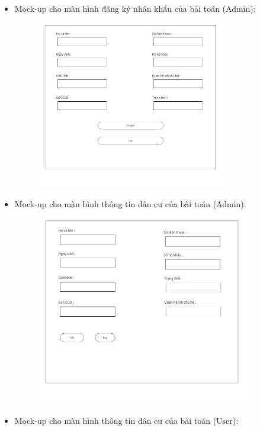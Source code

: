 \documentclass{article}
\begin{document}
\begin{itemize}
\begin{figure}[H]
    \end{figure}
    \item Mock-up cho màn hình đăng ký nhân khẩu của bài toán (Admin):
    \begin{figure}[H]
        \centering
        \includegraphics[width=0.8\textwidth]{Ảnh chương 4/Màn hình thêm thông tin dân cư.png}
    \end{figure}
    \newpage
    \item Mock-up cho màn hình thông tin dân cư của bài toán (Admin):
    \begin{figure}[H]
        \centering
        \includegraphics[width=0.9\textwidth]{Ảnh chương 4/Màn hình thông tin cư dân (admin).png}
    \end{figure}
    \item Mock-up cho màn hình thông tin dân cư của bài toán (User):

\end{itemize}
\end{document}
